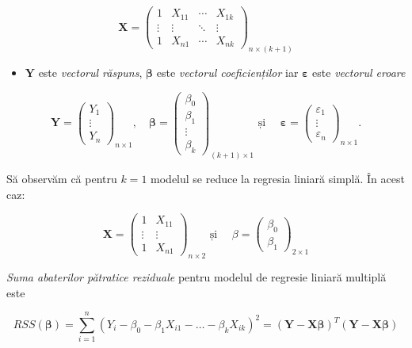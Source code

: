 \documentclass[]{article}
\providecommand{\tightlist}{%
  \setlength{\itemsep}{0pt}\setlength{\parskip}{0pt}}
\begin{document}
\[
\mathbf{X}=\begin{pmatrix}
1 & X_{11} & \cdots & X_{1k}\\
\vdots & \vdots & \ddots & \vdots\\
1 & X_{n1} & \cdots & X_{nk}
\end{pmatrix}_{n\times(k+1)}
\]

\begin{itemize}
\tightlist
\item
  \(\mathbf{Y}\) este \emph{vectorul răspuns}, \(\boldsymbol\beta\) este
  \emph{vectorul coeficienților} iar \(\boldsymbol\varepsilon\) este
  \emph{vectorul eroare}
\end{itemize}

\[
\mathbf{Y}=\begin{pmatrix}
Y_1 \\
\vdots \\
Y_n
\end{pmatrix}_{n\times 1},\quad\boldsymbol\beta=\begin{pmatrix}
\beta_0 \\
\beta_1 \\
\vdots \\
\beta_k
\end{pmatrix}_{(k+1)\times 1}\text{ și }\quad
\boldsymbol\varepsilon=\begin{pmatrix}
\varepsilon_1 \\
\vdots \\
\varepsilon_n
\end{pmatrix}_{n\times 1}.
\]


Să observăm că pentru \(k=1\) modelul se reduce la regresia liniară
simplă. În acest caz:

\[
\mathbf{X}=\begin{pmatrix}
1 & X_{11}\\
\vdots & \vdots\\
1 & X_{n1}
\end{pmatrix}_{n\times2}\text{ și }\quad \beta=\begin{pmatrix}
\beta_0 \\
\beta_1 
\end{pmatrix}_{2\times 1}
\]


\emph{Suma abaterilor pătratice reziduale} pentru modelul de regresie
liniară multiplă este

\[
RSS(\boldsymbol\beta)=\sum_{i=1}^n(Y_i-\beta_0-\beta_1X_{i1}-\ldots-\beta_kX_{ik})^2=(\mathbf{Y}-\mathbf{X}\boldsymbol{\beta})^T(\mathbf{Y}-\mathbf{X}\boldsymbol{\beta})
\]
\end{document}
